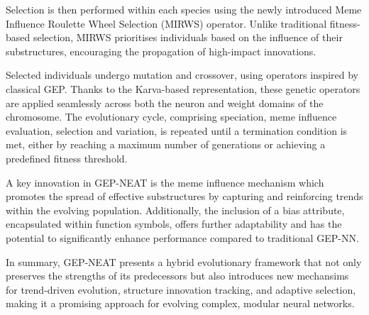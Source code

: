 \parbreak\noindent Selection is then performed within each species using the newly introduced Meme Influence Roulette Wheel Selection (MIRWS) operator. Unlike traditional fitness-based selection, MIRWS prioritises individuals based on the influence of their substructures, encouraging the propagation of high-impact innovations.

\parbreak\noindent Selected individuals undergo mutation and crossover, using operators inspired by classical GEP. Thanks to the Karva-based representation, these genetic operators are applied seamlessly across both the neuron and weight domains of the chromosome. The evolutionary cycle, comprising speciation, meme influence evaluation, selection and variation, is repeated until a termination condition is met, either by reaching a maximum number of generations or achieving a predefined fitness threshold.

\parbreak\noindent A key innovation in GEP-NEAT is the meme influence mechanism which promotes the spread of effective substructures by capturing and reinforcing trends within the evolving population. Additionally, the inclusion of a bias attribute, encapsulated within function symbols, offers further adaptability and has the potential to significantly enhance performance compared to traditional GEP-NN.

\parbreak\noindent In summary, GEP-NEAT presents a hybrid evolutionary framework that not only preserves the strengths of its predecessors but also introduces new mechansims for trend-driven evolution, structure innovation tracking, and adaptive selection, making it a promising approach for evolving complex, modular neural networks.